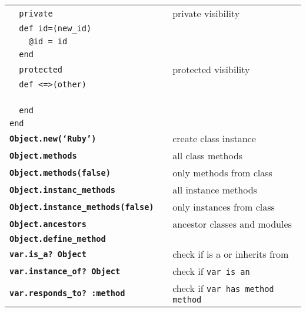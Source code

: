 \documentclass[6pt]{article}
\begin{document}
\begin{multicols}{3}
\begin{tabular}{L{0.55\linewidth} L{0.45\linewidth}}
    \tt ~~private                                & private visibility                                    \\
    \tt ~~def id=(new\_id)                                                                               \\
    \tt ~~~~@id = id                                                                                     \\
    \tt ~~end                                                                                            \\
    \tt ~~protected                              & protected visibility                                  \\
    \tt ~~def <=>(other)                                                                                 \\
    \tt ~~~~                                                                              \\
    \tt ~~end                                                                                            \\
    \tt end                                                                                              \\
    \tt \textbf{Object.new(`Ruby')}              & create class instance                                 \\
    \tt \textbf{Object.methods}                  & all class methods                                     \\
    \tt \textbf{Object.methods(false)}           & only methods from class                               \\
    \tt \textbf{Object.instanc\_methods}         & all instance methods                                  \\
    \tt \textbf{Object.instance\_methods(false)} & only instances from class                             \\
    \tt \textbf{Object.ancestors}                & ancestor classes and modules                          \\
    \tt \textbf{Object.define\_method}           & \\
    \tt \textbf{var.is\_a? Object}               & check if  is a or inherits from  \\
    \tt \textbf{var.instance\_of? Object}        & check if \tt{var} is an                   \\
    \tt \textbf{var.responds\_to? :method}       & check if \tt{var} has method \tt{method}              \\
  \end{tabular}


\end{multicols}
\end{document}
